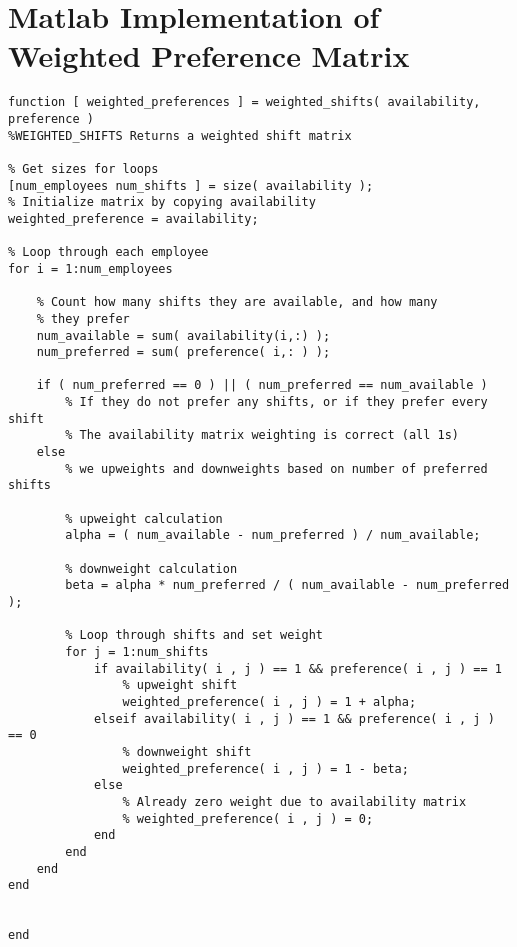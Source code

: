 \chapter{Matlab Implementation of Weighted Preference Matrix}
\begin{verbatim}
function [ weighted_preferences ] = weighted_shifts( availability, preference )
%WEIGHTED_SHIFTS Returns a weighted shift matrix 

% Get sizes for loops
[num_employees num_shifts ] = size( availability );
% Initialize matrix by copying availability 
weighted_preference = availability;

% Loop through each employee
for i = 1:num_employees

    % Count how many shifts they are available, and how many 
    % they prefer
	num_available = sum( availability(i,:) );
	num_preferred = sum( preference( i,: ) );

	if ( num_preferred == 0 ) || ( num_preferred == num_available )
		% If they do not prefer any shifts, or if they prefer every shift
		% The availability matrix weighting is correct (all 1s)
	else 
		% we upweights and downweights based on number of preferred shifts 

		% upweight calculation
		alpha = ( num_available - num_preferred ) / num_available;
		
		% downweight calculation
		beta = alpha * num_preferred / ( num_available - num_preferred );
		
		% Loop through shifts and set weight
		for j = 1:num_shifts
			if availability( i , j ) == 1 && preference( i , j ) == 1
				% upweight shift
				weighted_preference( i , j ) = 1 + alpha;
			elseif availability( i , j ) == 1 && preference( i , j ) == 0
				% downweight shift
				weighted_preference( i , j ) = 1 - beta;
			else
				% Already zero weight due to availability matrix
				% weighted_preference( i , j ) = 0;
			end
		end
	end
end


end

\end{verbatim}